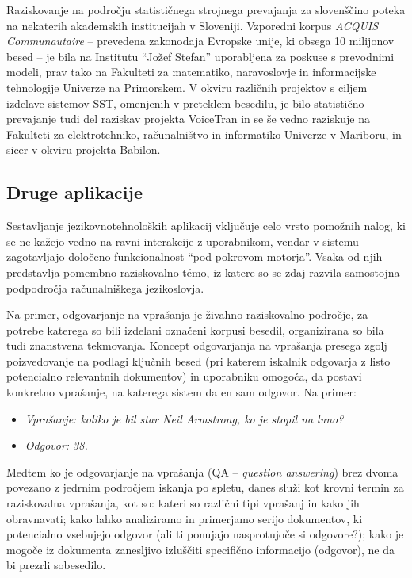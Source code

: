 \begin{multicols}{2}
Raziskovanje na področju statističnega stroj\-nega prevajanja za slovenščino poteka na nekaterih akademskih institucijah v Sloveniji. Vzporedni korpus \textit{ACQUIS Communautaire} \cite{ET1} – prevedena zako\-nodaja Evropske unije, ki obsega 10 mili\-jonov besed – je bila na Institutu “Jožef Stefan” uporab\-ljena za poskuse s prevodnimi mo\-deli, prav tako na Fakulteti za matema\-tiko, naravoslovje in informacij\-ske tehnologije Univerze na Primorskem. V okviru različnih projektov s ciljem izdelave sistemov SST, omenjenih v preteklem besedilu, je bilo statistično prevajanje tudi del raziskav projekta VoiceTran in se še vedno raziskuje na Fakulteti za elektrotehniko, računalništvo in informatiko Univerze v Mariboru, in sicer v okviru projekta Babilon.

\subsection{Druge aplikacije}

Sestav\-ljanje jezikovnotehnoloških aplikacij vključuje celo vrsto pomožnih nalog, ki se ne kažejo vedno na ravni interakcije z uporabnikom, vendar v sistemu zagotav\-ljajo določeno funkcionalnost “pod pokrovom motorja”. Vsaka od njih predstav\-lja pomembno raziskovalno témo, iz katere so se zdaj razvila samostojna podpodročja računalniškega jezikoslovja.

Na primer, odgovarjanje na vprašanja je živahno raziskovalno področje, za potrebe katerega so bili izdelani označeni korpusi besedil, organizirana so bila tudi znanstvena tekmovanja. Koncept odgovarjanja na vprašanja presega zgolj poizvedovanje na podlagi ključnih besed (pri katerem iskalnik odgovarja z listo potencialno relevantnih dokumentov) in uporabniku omogoča, da postavi konkretno vprašanje, na katerega sistem da en sam odgo\-vor. Na primer:
\begin{itemize}
\item[]\textit{Vprašanje: koliko je bil star Neil Armstrong, ko je stopil na luno?}
\item[]\textit{Odgovor: 38.}
\end{itemize}

Medtem ko je odgovarjanje na vprašanja (QA – \textit{question answering}) brez dvoma povezano z jedrnim področjem iskanja po spletu, danes služi kot krovni termin za raziskovalna vprašanja, kot so: kateri so različni tipi vprašanj in kako jih obravnavati; kako lahko analiziramo in primerjamo serijo dokumentov, ki potencialno vsebujejo odgo\-vor (ali ti ponujajo nasprotujoče si odgo\-vore?); kako je mogoče iz dokumenta zanesljivo izluščiti specifično informacijo (odgo\-vor), ne da bi prezrli sobesedilo.


\end{multicols}
